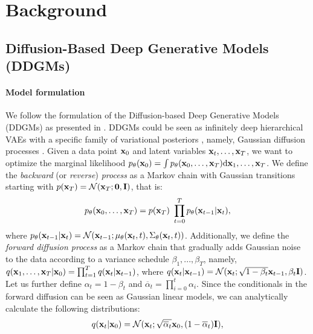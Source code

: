 
\section{Background}\label{sec:background}

\subsection{Diffusion-Based Deep Generative Models (DDGMs)}\label{sec:background_ddgm}


\paragraph{Model formulation}
We follow the formulation of the Diffusion-based Deep Generative Models (DDGMs) as presented in \cite{ho2020denoising,sohl2015deep}. DDGMs could be seen as infinitely deep hierarchical VAEs with a specific family of variational posteriors \cite{huang2021variational, kingma2021variational, tomczak2022deep, tzen2019neural}, namely, Gaussian diffusion processes \cite{sohl2015deep}. Given a data point ${\mathbf{x}}_0$ and latent variables ${\mathbf{x}}_{t}, \ldots, {\mathbf{x}}_{T}$, we want to optimize the marginal likelihood $p_{\theta}({\mathbf{x}}_0) = \int p_{\theta}({\mathbf{x}}_0, \ldots, {\mathbf{x}}_{T}) \mathrm{d} {\mathbf{x}}_1, \ldots, {\mathbf{x}}_{T}$. We define the \textit{backward} (or \textit{reverse}) \textit{process} as a Markov chain with Gaussian transitions starting with $p({\mathbf{x}}_T) = \mathcal{N}({\mathbf{x}}_{T}; \boldsymbol{0}, \mathbf{I})$, that is:
\begin{equation} \label{eq:backward_diffusion}
    p_{\theta}(\rvx_0, \ldots, \rvx_{T}) = p(\rvx_T)\ \prod_{t=0}^{T} p_{\theta}(\rvx_{t-1} | \rvx_{t}),
\end{equation}
where $p_{\theta}({\mathbf{x}}_{t-1} | {\mathbf{x}}_{t}) = \mathcal{N}({\mathbf{x}}_{t-1}; \mu_{\theta}({\mathbf{x}}_{t}, t), \Sigma_{\theta}({\mathbf{x}}_{t}, t))$.
Additionally, we define the \textit{forward diffusion process} as a Markov chain that gradually adds Gaussian noise to the data according to a variance schedule $\beta_1,...,\beta_T$, namely, $q({\mathbf{x}}_1, \ldots , {\mathbf{x}}_{T} | {\mathbf{x}}_{0}) = \prod_{t=1}^{T} q({\mathbf{x}}_t | {\mathbf{x}}_{t-1})$, where $q({\mathbf{x}}_t|{\mathbf{x}}_{t-1}) = \mathcal{N}({\mathbf{x}}_t; \sqrt{1 - \beta_t} {\mathbf{x}}_{t-1}, \beta_t \mathbf{I})$. 
Let us further define $\alpha_t = 1 - \beta_t$ and $\overline{\alpha}_t = \prod_{i=0}^{t} \alpha_{i}$. Since the conditionals in the forward diffusion can be seen as Gaussian linear models, we can analytically calculate the following distributions: 
\begin{equation}\label{eq:forward_diffusion_latent_from_data}
    q(\rvx_t|\rvx_0) = \mathcal{N}(\rvx_t; \sqrt{\overline{\alpha}_t} \rvx_0, (1 - \overline{\alpha}_t) \mathbf{I}),
\end{equation}

